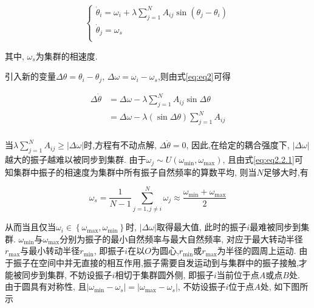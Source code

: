 \documentclass{article}
\begin{document}
\begin{equation}\label{eq:eq2}
	\begin{cases}
		\dot{\theta}_i=\omega _i+\lambda \sum_{j=1}^N{A_{ij}\sin \left( \theta _j-\theta _i \right)}\\
		\dot{\theta}_j=\omega _s\\
	\end{cases}
\end{equation}

其中, $\omega _s$为集群的相速度.

引入新的变量$\Delta \theta =\theta _i-\theta _j$, $\Delta \omega =\omega _i-\omega _s$,则由式\ref{eq:eq2}可得

\begin{equation}\label{eq:eq3}
	\begin{aligned}
		\Delta \dot{\theta}&=\Delta \omega -\lambda \sum_{j=1}^N{A_{ij}\sin \Delta \theta}\\
		&=\Delta \omega -\lambda \left( \sin \Delta \theta \right) \sum_{j=1}^N{A_{ij}}\\
	\end{aligned}
\end{equation}

当$\lambda \sum_{j=1}^N{A_{ij}}\geqslant \left| \Delta \omega \right|$时,方程有不动点解, $\Delta \dot{\theta}=0$, 因此,在给定的耦合强度下, $\left| \Delta \omega \right|$越大的振子越难以被同步到集群. 由于$\omega _j\sim U\left( \omega _{\min}, \omega _{\max} \right) $, 且由式\ref{eq:eq2.2.1}可知集群中振子的相速度为集群中所有振子自然频率的算数平均, 则当$N$足够大时,有

$$
\omega _s=\frac{1}{N-1}\sum_{j=1,j\ne i}^N{\omega _j}\approx \frac{\omega _{\min}+\omega _{\max}}{2}
$$

从而当且仅当$\omega _i\in \left\{ \omega _{\max},\omega _{\min} \right\}$时, $\left| \Delta \omega \right|$取得最大值, 此时的振子$i$最难被同步到集群. 
$\omega _{\min}$与$\omega _{\max}$分别为振子的最小自然频率与最大自然频率, 对应于最大转动半径$r_{\max}$与最小转动半径$r_{\min}$, 即振子$i$在以$O$为圆心,$r_{\min}$或$r_{\max}$为半径的圆周上运动. 
由于振子在空间中并无直接的相互作用,振子需要自发运动到与集群中的振子接触,才能被同步到集群, 不妨设振子$i$相切于集群圆外侧, 即振子$i$当前位于点$A$或点$B$处.
由于圆具有对称性, 且$\left| \omega _{\min}-\omega _s \right|=\left| \omega _{\max}-\omega _s \right|$, 不妨设振子$i$位于点$A$处, 如下图所示
\end{document}

